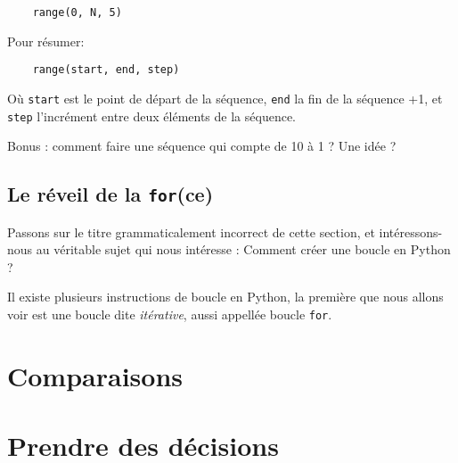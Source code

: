 \begin{lstlisting}
    range(0, N, 5)
\end{lstlisting}

Pour résumer:

\begin{lstlisting}
    range(start, end, step)
\end{lstlisting}

Où \texttt{start} est le point de départ de la séquence, \texttt{end} la fin de la séquence +1, et \texttt{step} l'incrément entre deux éléments de la séquence.

Bonus : comment faire une séquence qui compte de 10 à 1 ? Une idée ?

\subsection{Le réveil de la \texttt{for}(ce)}

Passons sur le titre grammaticalement incorrect de cette section, et intéressons-nous au véritable sujet qui nous intéresse : Comment créer une boucle en Python ?

Il existe plusieurs instructions de boucle en Python, la première que nous allons voir est une boucle dite \emph{itérative}, aussi appellée boucle \texttt{for}. 

\section{Comparaisons}

\section{Prendre des décisions}
